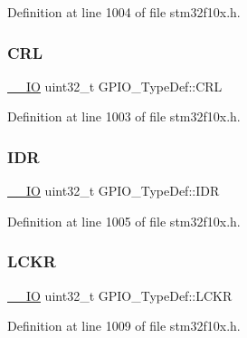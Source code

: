 Definition at line 1004 of file stm32f10x.\+h.

\mbox{\label{struct_g_p_i_o___type_def_a218d21e9ca712cec4ca8f00406b2ec29}} 
\subsubsection{\texorpdfstring{C\+RL}{CRL}}
{\footnotesize\ttfamily \hyperlink{core__sc300_8h_aec43007d9998a0a0e01faede4133d6be}{\+\_\+\+\_\+\+IO} uint32\+\_\+t G\+P\+I\+O\+\_\+\+Type\+Def\+::\+C\+RL}



Definition at line 1003 of file stm32f10x.\+h.

\mbox{\label{struct_g_p_i_o___type_def_acf11156409414ad8841bb0b62959ee96}} 
\subsubsection{\texorpdfstring{I\+DR}{IDR}}
{\footnotesize\ttfamily \hyperlink{core__sc300_8h_aec43007d9998a0a0e01faede4133d6be}{\+\_\+\+\_\+\+IO} uint32\+\_\+t G\+P\+I\+O\+\_\+\+Type\+Def\+::\+I\+DR}



Definition at line 1005 of file stm32f10x.\+h.

\mbox{\label{struct_g_p_i_o___type_def_a95a59d4b1d52be521f3246028be32f3e}} 
\subsubsection{\texorpdfstring{L\+C\+KR}{LCKR}}
{\footnotesize\ttfamily \hyperlink{core__sc300_8h_aec43007d9998a0a0e01faede4133d6be}{\+\_\+\+\_\+\+IO} uint32\+\_\+t G\+P\+I\+O\+\_\+\+Type\+Def\+::\+L\+C\+KR}



Definition at line 1009 of file stm32f10x.\+h.

